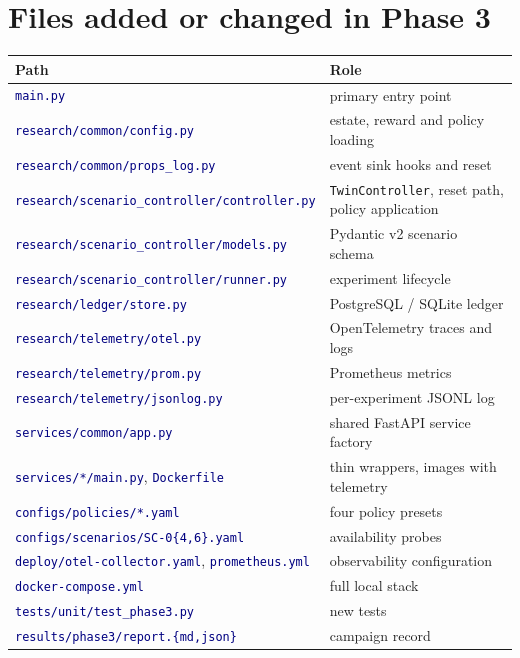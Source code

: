 \documentclass[11pt]{article}
\newcommand{\code}[1]{\texttt{\small #1}}
\newcommand{\file}[1]{\textcolor{navy}{\texttt{\small #1}}}
\begin{document}
\section{Files added or changed in Phase 3}
\begin{longtable}{>{\RaggedRight\arraybackslash}p{8.6cm} >{\RaggedRight\arraybackslash}p{5.2cm}}
\toprule
\textbf{Path} & \textbf{Role}\\
\midrule
\endhead
\file{main.py} & primary entry point\\
\file{research/common/config.py} & estate, reward and policy loading\\
\file{research/common/props\_log.py} & event sink hooks and reset\\
\file{research/scenario\_controller/controller.py} & \code{TwinController}, reset path, policy application\\
\file{research/scenario\_controller/models.py} & Pydantic v2 scenario schema\\
\file{research/scenario\_controller/runner.py} & experiment lifecycle\\
\file{research/ledger/store.py} & PostgreSQL / SQLite ledger\\
\file{research/telemetry/otel.py} & OpenTelemetry traces and logs\\
\file{research/telemetry/prom.py} & Prometheus metrics\\
\file{research/telemetry/jsonlog.py} & per-experiment JSONL log\\
\file{services/common/app.py} & shared FastAPI service factory\\
\file{services/*/main.py}, \file{Dockerfile} & thin wrappers, images with telemetry\\
\file{configs/policies/*.yaml} & four policy presets\\
\file{configs/scenarios/SC-0\{4,6\}.yaml} & availability probes\\
\file{deploy/otel-collector.yaml}, \file{prometheus.yml} & observability configuration\\
\file{docker-compose.yml} & full local stack\\
\file{tests/unit/test\_phase3.py} & 38 new tests\\
\file{results/phase3/report.\{md,json\}} & campaign record\\
\bottomrule
\end{longtable}
\end{document}
